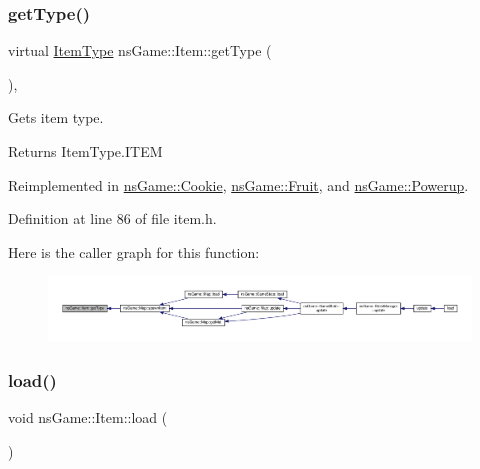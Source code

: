 \subsubsection{\texorpdfstring{get\+Type()}{getType()}}
{\footnotesize\ttfamily virtual \hyperlink{namespacens_game_a5f7db01e6447720e9a145f0b3c68a4d7}{Item\+Type} ns\+Game\+::\+Item\+::get\+Type (\begin{DoxyParamCaption}{ }\end{DoxyParamCaption})\hspace{0.3cm}{\ttfamily [inline]}, {\ttfamily [virtual]}}



Gets item type. 

\begin{DoxyReturn}{Returns}
Item\+Type.\+I\+T\+EM 
\end{DoxyReturn}


Reimplemented in \hyperlink{classns_game_1_1_cookie_ac5c28f610947708bc1f31b1e8a88ef42}{ns\+Game\+::\+Cookie}, \hyperlink{classns_game_1_1_fruit_a4d704f296f536afc2980183bb21e4c62}{ns\+Game\+::\+Fruit}, and \hyperlink{classns_game_1_1_powerup_a34f105d75a90ddbbc6afa46c83bdccf6}{ns\+Game\+::\+Powerup}.



Definition at line 86 of file item.\+h.

Here is the caller graph for this function\+:\nopagebreak
\begin{figure}[H]
\begin{center}
\leavevmode
\includegraphics[width=350pt]{structns_game_1_1_item_a69156550e5083928cbb673ca2db671f5_icgraph}
\end{center}
\end{figure}
\mbox{\label{structns_game_1_1_item_a5887b6e9225ae8a276801225eca83808}} 
\subsubsection{\texorpdfstring{load()}{load()}}
{\footnotesize\ttfamily void ns\+Game\+::\+Item\+::load (\begin{DoxyParamCaption}{ }\end{DoxyParamCaption})\hspace{0.3cm}{\ttfamily [pure virtual]}}



